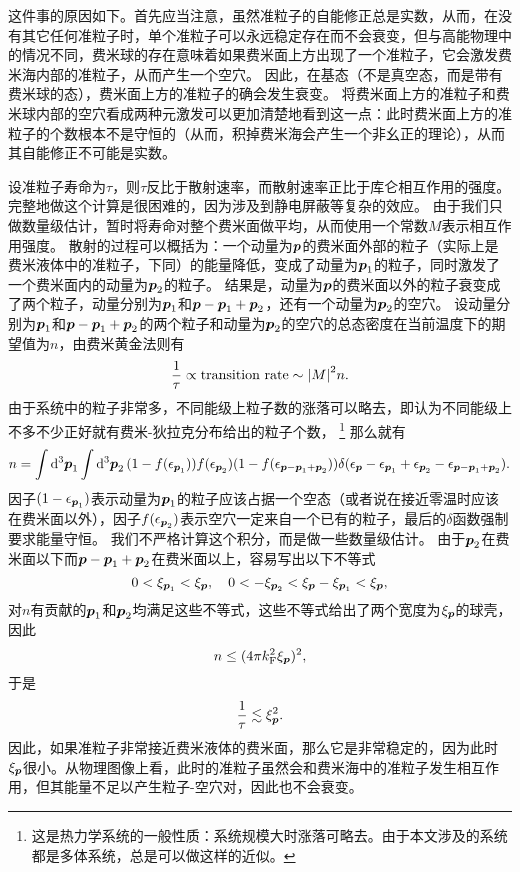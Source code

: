 这件事的原因如下。首先应当注意，虽然准粒子的自能修正总是实数，从而，在没有其它任何准粒子时，单个准粒子可以永远稳定存在而不会衰变，但与高能物理中的情况不同，费米球的存在意味着如果费米面上方出现了一个准粒子，它会激发费米海内部的准粒子，从而产生一个空穴。
因此，在基态（不是真空态，而是带有费米球的态），费米面上方的准粒子的确会发生衰变。
将费米面上方的准粒子和费米球内部的空穴看成两种元激发可以更加清楚地看到这一点：此时费米面上方的准粒子的个数根本不是守恒的（从而，积掉费米海会产生一个非幺正的理论），从而其自能修正不可能是实数。

设准粒子寿命为$\tau$，则$\tau$反比于散射速率，而散射速率正比于库仑相互作用的强度。完整地做这个计算是很困难的，因为涉及到静电屏蔽等复杂的效应。
由于我们只做数量级估计，暂时将寿命对整个费米面做平均，从而使用一个常数$M$表示相互作用强度。
散射的过程可以概括为：一个动量为$\vb*{p}$的费米面外部的粒子（实际上是费米液体中的准粒子，下同）的能量降低，变成了动量为$\vb*{p}_1$的粒子，同时激发了一个费米面内的动量为$\vb*{p}_2$的粒子。
结果是，动量为$\vb*{p}$的费米面以外的粒子衰变成了两个粒子，动量分别为$\vb*{p}_1$和$\vb*{p} - \vb*{p}_1 + \vb*{p}_2$，还有一个动量为$\vb*{p}_2$的空穴。
设动量分别为$\vb*{p}_1$和$\vb*{p} - \vb*{p}_1 + \vb*{p}_2$的两个粒子和动量为$\vb*{p}_2$的空穴的总态密度在当前温度下的期望值为$n$，由费米黄金法则有
\[
    \frac{1}{\tau} \propto \text{transition rate} \sim \abs{M}^2 n.
\]
由于系统中的粒子非常多，不同能级上粒子数的涨落可以略去，即认为不同能级上不多不少正好就有费米-狄拉克分布给出的粒子个数，%
\footnote{这是热力学系统的一般性质：系统规模大时涨落可略去。由于本文涉及的系统都是多体系统，总是可以做这样的近似。}%
那么就有
\[
    n = \int \dd[3]{\vb*{p}_1} \int \dd[3]{\vb*{p}_2} (1 - f(\epsilon_{\vb*{p}_1})) f(\epsilon_{\vb*{p}_2}) (1 - f(\epsilon_{\vb*{p} - \vb*{p}_1 + \vb*{p}_2})) \delta(\epsilon_{\vb*{p}} - \epsilon_{\vb*{p}_1} + \epsilon_{\vb*{p}_2} - \epsilon_{\vb*{p} - \vb*{p}_1 + \vb*{p}_2}).
\]
因子$(1-\epsilon_{\vb*{p}_1})$表示动量为$\vb*{p}_1$的粒子应该占据一个空态（或者说在接近零温时应该在费米面以外），因子$f(\epsilon_{\vb*{p}_2})$表示空穴一定来自一个已有的粒子，最后的$\delta$函数强制要求能量守恒。
我们不严格计算这个积分，而是做一些数量级估计。
由于$\vb*{p}_2$在费米面以下而$\vb*{p}- \vb*{p}_1 + \vb*{p}_2$在费米面以上，容易写出以下不等式
\[
    0 < \xi_{\vb*{p}_1} < \xi_{\vb*{p}}, \quad 0 < - \xi_{\vb*{p}_2} < \xi_{\vb*{p}} - \xi_{\vb*{p}_1} < \xi_{\vb*{p}},
\]
对$n$有贡献的$\vb*{p}_1$和$\vb*{p}_2$均满足这些不等式，这些不等式给出了两个宽度为$\xi_{\vb*{p}}$的球壳，因此
\[
    n \leq (4 \pi k_\text{F}^2 \xi_{\vb*{p}})^2,
\]
于是
\begin{equation}
    \frac{1}{\tau} \lesssim \xi_{\vb*{p}}^2.
\end{equation}
因此，如果准粒子非常接近费米液体的费米面，那么它是非常稳定的，因为此时$\xi_{\vb*{p}}$很小。从物理图像上看，此时的准粒子虽然会和费米海中的准粒子发生相互作用，但其能量不足以产生粒子-空穴对，因此也不会衰变。

